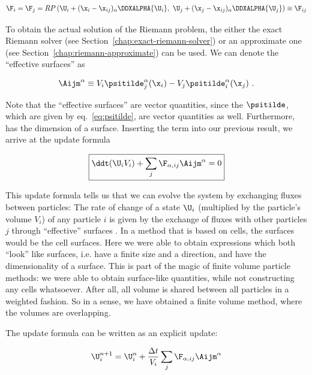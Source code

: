 \begin{align}
    \F_i = \F_j
    = RP
    \left(\U_i + (\x_{i} - \x_{ij})_\alpha \DDXALPHA{\U_i}, \
    \U_j + (\x_{j} - \x_{ij})_\alpha \DDXALPHA{\U_j} \right)
    \equiv \F_{ij}
\end{align}

To obtain the actual solution of the Riemann problem, the either the exact Riemann solver (see Section~\ref{chap:exact-riemann-solver}) or an approximate one (see Section~\ref{chap:riemann-approximate}) can be used.
We can denote the ``effective surfaces'' \Aij as

\begin{align}
    \Aijm^\alpha \equiv V_i \psitilde_j^\alpha(\x_i) - V_j \psitilde_i^\alpha (\x_j) \ .
    \label{eq:HopkinsAij}
\end{align}

Note that the ``effective surfaces'' \Aij are vector quantities, since the $\psitilde$, which
are given by eq.~\ref{eq:psitilde}, are vector quantities as well. Furthermore, \Aij has the
dimension of a surface. Inserting the term into our previous result, we arrive at the update formula

\begin{align}
\boxed{
    \ddt (\U_i V_i) + \sum_j \F_{\alpha, ij} \Aijm^\alpha = 0 \label{eq:meshless-Hopkins}
}
\end{align}

This update formula tells us that we can evolve the system by exchanging fluxes between particles:
The rate of change of a state $\U_i$ (multiplied by the particle's volume $V_i$) of any particle
$i$ is given by the exchange of fluxes with other particles $j$ through ``effective'' surfaces
\Aij. In a method that is based on cells, the surfaces would be the cell surfaces. Here we were able
to obtain expressions which both ``look'' like surfaces, i.e. have a finite size and a direction,
and have the dimensionality of a surface. This is part of the magic of finite volume particle
methods: we were able to obtain surface-like quantities, while not constructing any cells
whatsoever. After all, all volume is shared between all particles in a weighted fashion. So in a
sense, we have obtained a finite volume method, where the volumes are overlapping.

The update formula can be written as an explicit update:

\begin{align}
    \U_i^{n+1} = \U_i^{n} + \frac{\Delta t}{V_i} \sum_j  \F_{\alpha, ij} \Aijm^\alpha
\label{eq:meshless-Hopkins-explicit}
\end{align}


